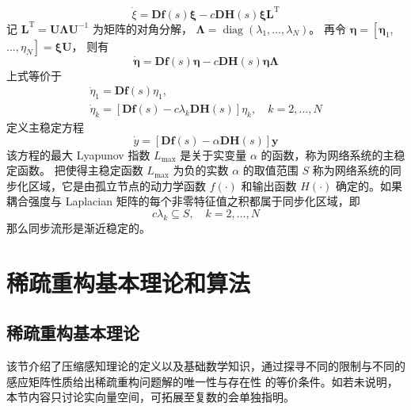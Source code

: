\begin{equation}
    \dot{\xi}=\boldsymbol{D} \boldsymbol{f}(s) \boldsymbol{\xi}-c \boldsymbol{D} \boldsymbol{H}(s) \boldsymbol{\xi} \boldsymbol{L}^{\mathrm{T}}
\end{equation}
记 $\boldsymbol{L}^{\mathrm{T}}=\boldsymbol{U} \boldsymbol{\Lambda} \boldsymbol{U}^{-1}$ 为矩阵的对角分解，
$\boldsymbol{\Lambda}=\operatorname{diag}\left(\lambda_1, \ldots, \lambda_N\right)$。 
再令 $\boldsymbol{\eta}=\left[\boldsymbol{\eta}_1\right.$, $\left.\ldots, \eta_N\right]=\boldsymbol{\xi U}$， 则有
\begin{equation}
    \dot{\boldsymbol{\eta}}=\boldsymbol{D} \boldsymbol{f}(s) \boldsymbol{\eta}-c \boldsymbol{D} \boldsymbol{H}(s) \boldsymbol{\eta} \mathbf{\Lambda}
\end{equation}
上式等价于
\begin{equation}
    \begin{gathered}
    \dot{\eta}_1=\boldsymbol{D} \boldsymbol{f}(s) \eta_1, \\
    \dot{\eta}_k=\left[\boldsymbol{D} \boldsymbol{f}(s)-c \lambda_k \boldsymbol{D} \boldsymbol{H}(s)\right] \eta_k, \quad k=2, \ldots, N
    \end{gathered}
\end{equation}
定义主稳定方程
\begin{equation}
    \dot{y}=[\boldsymbol{D} \boldsymbol{f}(s)-\alpha \boldsymbol{D} \boldsymbol{H}(s)] \boldsymbol{y}
\end{equation}
该方程的最大 Lyapunov 指数 $L_{\max }$ 是关于实变量 $\alpha$ 的函数，称为网络系统的主稳定函数。
把使得主稳定函数 $L_{\max }$ 为负的实数 $\alpha$ 的取值范围 $S$ 称为网络系统的同步化区域，它是由孤立节点的动力学函数 $f(\cdot)$ 和输出函数
$H(\cdot)$ 确定的。如果耦合强度与 Laplacian 矩阵的每个非零特征值之积都属于同步化区域，即
\begin{equation}
    c \lambda_k \subseteq S, \quad k=2, \ldots, N
\end{equation}
那么同步流形是渐近稳定的。
\section{稀疏重构基本理论和算法}
\subsection{稀疏重构基本理论}
该节介绍了压缩感知理论的定义以及基础数学知识，通过探寻不同的限制与不同的感应矩阵性质给出稀疏重构问题解的唯一性与存在性
的等价条件。如若未说明，本节内容只讨论实向量空间，可拓展至复数的会单独指明。
